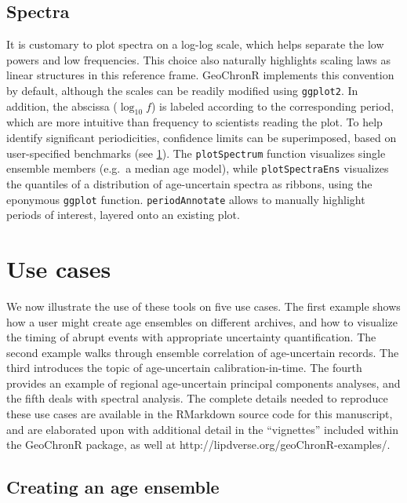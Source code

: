 \documentclass[gchron, manuscript]{copernicus}
\begin{document}
\hypertarget{sec:spec_viz}{%
\subsection{Spectra}\label{sec:spec_viz}}

It is customary to plot spectra on a log-log scale, which helps separate the low powers and low frequencies.
This choice also naturally highlights scaling laws \citep{lovejoy2013weather, ZhuPNAS2019} as linear structures in this reference frame.
GeoChronR implements this convention by default, although the scales can be readily modified using \texttt{ggplot2}.
In addition, the abscissa (\(\log_{10} f\)) is labeled according to the corresponding period, which are more intuitive than frequency to scientists reading the plot.
To help identify significant periodicities, confidence limits can be superimposed, based on user-specified benchmarks (see \ref{sec:use-cases}).
The \texttt{plotSpectrum} function visualizes single ensemble members (e.g.~a median age model), while \texttt{plotSpectraEns} visualizes the quantiles of a distribution of age-uncertain spectra as ribbons, using the eponymous \texttt{ggplot} function.
\texttt{periodAnnotate} allows to manually highlight periods of interest, layered onto an existing plot.

\hypertarget{sec:use-cases}{%
\section{Use cases}\label{sec:use-cases}}

We now illustrate the use of these tools on five use cases.
The first example shows how a user might create age ensembles on different archives, and how to visualize the timing of abrupt events with appropriate uncertainty quantification.
The second example walks through ensemble correlation of age-uncertain records.
The third introduces the topic of age-uncertain calibration-in-time.
The fourth provides an example of regional age-uncertain principal components analyses, and the fifth deals with spectral analysis.
The complete details needed to reproduce these use cases are available in the RMarkdown source code for this manuscript, and are elaborated upon with additional detail in the ``vignettes'' included within the GeoChronR package, as well at http://lipdverse.org/geoChronR-examples/.

\subsection{Creating an age ensemble}
\end{document}
